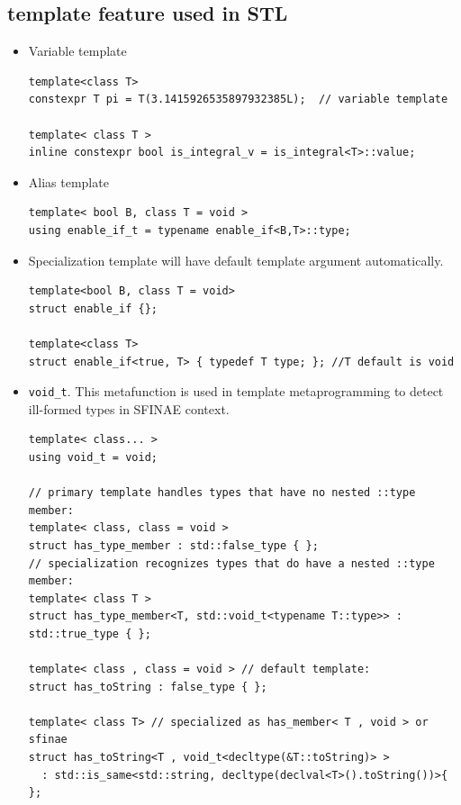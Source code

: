 \documentclass[a4paper,11pt,twoside]{book}
\begin{document}
\subsection{template feature used in STL}
\begin{itemize}
	\item Variable template
\begin{lstlisting}[]
template<class T>
constexpr T pi = T(3.1415926535897932385L);  // variable template	

template< class T >
inline constexpr bool is_integral_v = is_integral<T>::value;
\end{lstlisting}

	\item Alias template
\begin{lstlisting}[]
template< bool B, class T = void >
using enable_if_t = typename enable_if<B,T>::type;
\end{lstlisting}
	
	\item Specialization template will have default template argument automatically.
\begin{lstlisting}[numbers=none]
template<bool B, class T = void>
struct enable_if {};

template<class T>
struct enable_if<true, T> { typedef T type; }; //T default is void
\end{lstlisting}


    \item \texttt{void\_t}. This metafunction is used in template metaprogramming to detect ill-formed types in SFINAE context.
\begin{lstlisting}
template< class... >
using void_t = void;

// primary template handles types that have no nested ::type member:
template< class, class = void >
struct has_type_member : std::false_type { };
// specialization recognizes types that do have a nested ::type member:
template< class T >
struct has_type_member<T, std::void_t<typename T::type>> : std::true_type { };

template< class , class = void > // default template:
struct has_toString : false_type { };

template< class T> // specialized as has_member< T , void > or sfinae
struct has_toString<T , void_t<decltype(&T::toString)> > 
  : std::is_same<std::string, decltype(declval<T>().toString())>{ };
\end{lstlisting}


\end{itemize}
\end{document}
